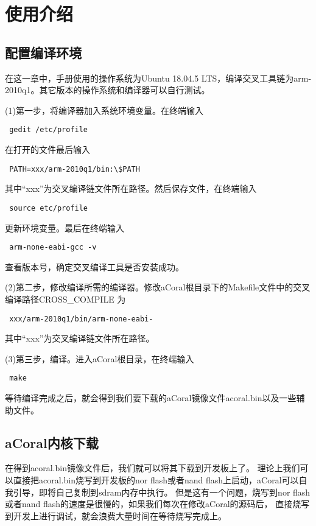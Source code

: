 \chapter{使用介绍}
\section{配置编译环境}

在这一章中，手册使用的操作系统为Ubuntu 18.04.5 LTS，编译交叉工具链为arm-2010q1。其它版本的操作系统和编译器可以自行测试。

(1)第一步，将编译器加入系统环境变量。在终端输入
\begin{lstlisting}
 gedit /etc/profile   
\end{lstlisting}

在打开的文件最后输入
\begin{lstlisting}
 PATH=xxx/arm-2010q1/bin:\$PATH  
\end{lstlisting}

其中“xxx”为交叉编译链文件所在路径。然后保存文件，在终端输入
\begin{lstlisting}
 source etc/profile
\end{lstlisting}

更新环境变量。最后在终端输入
\begin{lstlisting}
 arm-none-eabi-gcc -v
\end{lstlisting}

查看版本号，确定交叉编译工具是否安装成功。

(2)第二步，修改编译所需的编译器。修改aCoral根目录下的Makefile文件中的交叉编译路径CROSS\_COMPILE 为
\begin{lstlisting}
 xxx/arm-2010q1/bin/arm-none-eabi-
\end{lstlisting}

其中“xxx”为交叉编译链文件所在路径。

(3)第三步，编译。进入aCoral根目录，在终端输入
\begin{lstlisting}
 make
\end{lstlisting}

等待编译完成之后，就会得到我们要下载的aCoral镜像文件acoral.bin以及一些辅助文件。

\section{aCoral内核下载}

在得到acoral.bin镜像文件后，我们就可以将其下载到开发板上了。
理论上我们可以直接把acoral.bin烧写到开发板的nor flash或者nand flash上启动，aCoral可以自我引导，即将自己复制到sdram内存中执行。
但是这有一个问题，烧写到nor flash或者nand flash的速度是很慢的，如果我们每次在修改aCoral的源码后，
直接烧写到开发上进行调试，就会浪费大量时间在等待烧写完成上。

